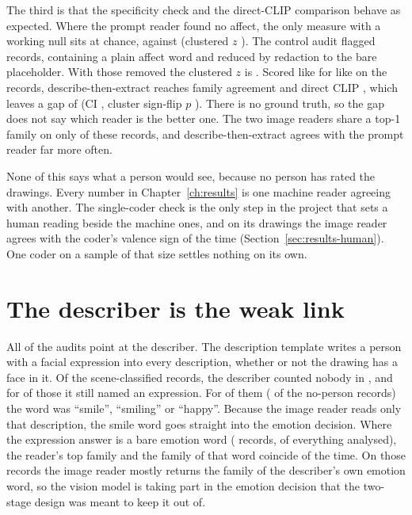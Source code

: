The third is that the specificity check and the direct-CLIP comparison behave as expected. Where the prompt reader found no affect, the only measure with a working null sits at chance, \CtrlVaObs{} against \CtrlVaNull{} (clustered $z$ \CtrlVaZClustered{}). The control audit flagged \CtrlRemoved{} records, \CtrlFlagged{} containing a plain affect word and \CtrlNameOnly{} reduced by redaction to the bare placeholder. With those removed the clustered $z$ is \CtrlCleanVaZClustered{}. Scored like for like on the \McN{} records, describe-then-extract reaches \McDeFam{} family agreement and direct CLIP \McClipFam{}, which leaves a gap of \McDiffFamPp{} (CI \McDiffFamCi{}, cluster sign-flip $p$ \McClusterFamP{}). There is no ground truth, so the gap does not say which reader is the better one. The two image readers share a top-1 family on only \McReaderAgree{} of these records, and describe-then-extract agrees with the prompt reader far more often.

None of this says what a person would see, because no person has rated the drawings. Every number in Chapter~\ref{ch:results} is one machine reader agreeing with another. The single-coder check is the only step in the project that sets a human reading beside the machine ones, and on its \HcN{} drawings the image reader agrees with the coder's valence sign \HcReaderSign{} of the time (Section~\ref{sec:results-human}). One coder on a sample of that size settles nothing on its own.

\section{The describer is the weak link}
\label{sec:disc-describer}

All of the audits point at the describer. The description template writes a person with a facial expression into every description, whether or not the drawing has a face in it. Of the \DescSceneN{} scene-classified records, the describer counted nobody in \DescScenePeopleZero{}, and for \DescScenePeopleZeroExpr{} of those it still named an expression. For \DescSceneSmile{} of them (\DescSceneSmilePct{} of the no-person records) the word was ``smile'', ``smiling'' or ``happy''. Because the image reader reads only that description, the smile word goes straight into the emotion decision. Where the expression answer is a bare emotion word (\DescBareStrictN{} records, \DescBareStrictPct{} of everything analysed), the reader's top family and the family of that word coincide \DescCopyStrict{} of the time. On those records the image reader mostly returns the family of the describer's own emotion word, so the vision model is taking part in the emotion decision that the two-stage design was meant to keep it out of.


